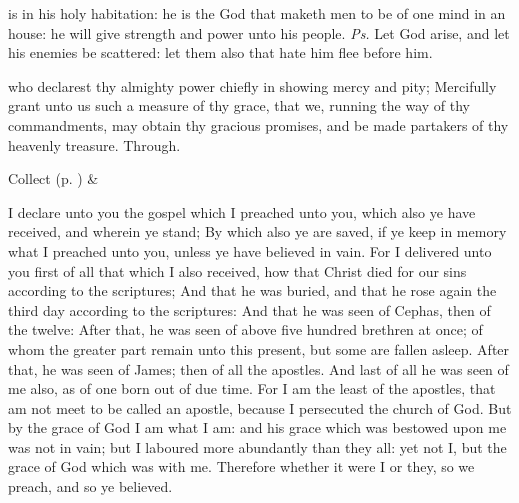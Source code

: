 
\introit
{} is in his holy habitation: he is the God that maketh men to be of one mind in an house: he will give strength and power unto his people. \textit{Ps.} Let God arise, and let his enemies be scattered: let them also that hate him flee before him.

\collect
{} who declarest thy almighty power chiefly in showing mercy and pity; Mercifully grant unto us such a measure of thy grace, that we, running the way of thy commandments, may obtain thy gracious promises, and be made partakers of thy heavenly treasure. Through.
\begin{rubric}
     Collect  (p. \pageref{SPSaints}) \&  
\end{rubric}

 I declare unto you the gospel which I preached unto you, which also ye have received, and wherein ye stand; By which also ye are saved, if ye keep in memory what I preached unto you, unless ye have believed in vain. For I delivered unto you first of all that which I also received, how that Christ died for our sins according to the scriptures; And that he was buried, and that he rose again the third day according to the scriptures: And that he was seen of Cephas, then of the twelve: After that, he was seen of above five hundred brethren at once; of whom the greater part remain unto this present, but some are fallen asleep. After that, he was seen of James; then of all the apostles. And last of all he was seen of me also, as of one born out of due time. For I am the least of the apostles, that am not meet to be called an apostle, because I persecuted the church of God. But by the grace of God I am what I am: and his grace which was bestowed upon me was not in vain; but I laboured more abundantly than they all: yet not I, but the grace of God which was with me. Therefore whether it were I or they, so we preach, and so ye believed.


